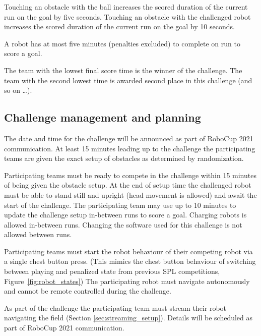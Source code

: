 Touching an obstacle with the ball increases the scored duration of the current run on the goal by five seconds. Touching an obstacle with the challenged robot increases the scored duration of the current run on the goal by 10 seconds.

A robot has at most five minutes (penalties excluded) to complete on run to score a goal.

The team with the lowest final score time is the winner of the challenge. The team with the second lowest time is awarded second place in this challenge (and so on \ldots).

\subsection{Challenge management and planning}

The date and time for the challenge will be announced as part of RoboCup 2021 communication. At least 15 minutes leading up to the challenge the participating teams are given the exact setup of obstacles as determined by randomization.

Participating teams must be ready to compete in the challenge within 15 minutes of being given the obstacle setup. At the end of setup time the challenged robot must be able to stand still and upright (head movement is allowed) and await the start of the challenge. The participating team may use up to 10 minutes to update the challenge setup in-between runs to score a goal. Charging robots is allowed in-between runs. Changing the software used for this challenge is not allowed between runs.

Participating teams must start the robot behaviour of their competing robot via a single chest button press. (This mimics the chest button behaviour of switching between playing and penalized state from previous SPL competitions, \cf Figure~\ref{fig:robot_states}) The participating robot must navigate autonomously and cannot be remote controlled during the challenge.

As part of the challenge the participating team must stream their robot navigating the field (\cf Section \ref{sec:streaming_setup}). Details will be scheduled as part of RoboCup 2021 communication.

